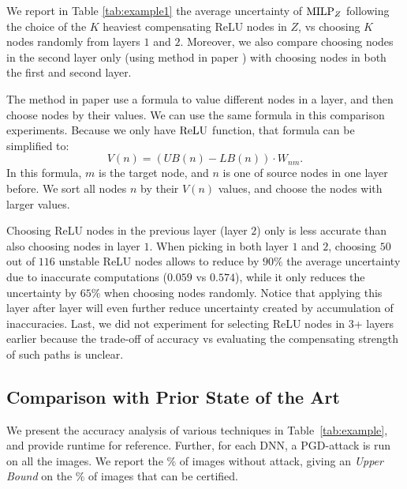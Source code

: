 {\color{red} We report in Table \ref{tab:example1} the average uncertainty of ${\textrm{MILP}}_Z$ following the choice of the $K$ heaviest compensating ReLU nodes in $Z$, vs choosing $K$ nodes randomly from layers $1$ and $2$. 
	Moreover, we also compare choosing nodes in the second layer only (using method in paper \cite{ DivideAndSlide}) with choosing nodes in both the first and second layer.
	
	
		The method in paper \cite{ DivideAndSlide} use a formula to value different nodes in a layer, and then choose nodes by their values. We can use the same formula in this comparison experiments. Because we only have $\mathrm{ReLU}$ function, that formula can be simplified to: $$V(n) = (UB(n)-LB(n))\cdot W_{nm}.$$ In this formula, $m$ is the target node, and $n$ is one of source nodes in one layer before. We sort all nodes $n$ by their $V(n)$ values, and choose the nodes with larger values. 
	
	
	
	Choosing ReLU nodes in the previous layer (layer $2$) only is less accurate than 
	also choosing nodes in layer $1$. 	When picking in both layer $1$ and $2$, choosing $50$ out of $116$ unstable ReLU nodes allows to reduce by $90\%$ the average uncertainty due to inaccurate computations ($0.059$ vs $0.574$), while it only reduces the uncertainty by $65\%$ when choosing nodes randomly. Notice that applying this layer after layer will even further reduce uncertainty created by accumulation of inaccuracies. 
	Last, we did not experiment for selecting ReLU nodes in 3+ layers earlier because the trade-off of accuracy vs evaluating the compensating strength of such paths is unclear. 
	
}
\fi










\subsection{Comparison with Prior State of the Art}

We present the accuracy analysis of various techniques in Table~\ref{tab:example}, and provide runtime for reference. Further, for each DNN, a PGD-attack \cite{attack} is run 
on all the images. We report the $\%$ of images without attack, giving an {\em Upper Bound} on the $\%$ of images that can be certified.

